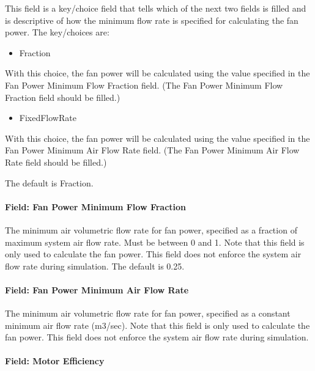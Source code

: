 This field is a key/choice field that tells which of the next two fields is filled and is descriptive of how the minimum flow rate is specified for calculating the fan power. The key/choices are:

\begin{itemize}
\tightlist
\item
  Fraction
\end{itemize}

With this choice, the fan power will be calculated using the value specified in the Fan Power Minimum Flow Fraction field. (The Fan Power Minimum Flow Fraction field should be filled.)

\begin{itemize}
\tightlist
\item
  FixedFlowRate
\end{itemize}

With this choice, the fan power will be calculated using the value specified in the Fan Power Minimum Air Flow Rate field. (The Fan Power Minimum Air Flow Rate field should be filled.)

The default is Fraction.

\paragraph{Field: Fan Power Minimum Flow Fraction}\label{field-fan-power-minimum-flow-fraction}

The minimum air volumetric flow rate for fan power, specified as a fraction of maximum system air flow rate. Must be between 0 and 1. Note that this field is only used to calculate the fan power. This field does not enforce the system air flow rate during simulation. The default is 0.25.

\paragraph{Field: Fan Power Minimum Air Flow Rate}\label{field-fan-power-minimum-air-flow-rate}

The minimum air volumetric flow rate for fan power, specified as a constant minimum air flow rate (m3/sec). Note that this field is only used to calculate the fan power. This field does not enforce the system air flow rate during simulation.

\paragraph{Field: Motor Efficiency}\label{field-motor-efficiency-2}

